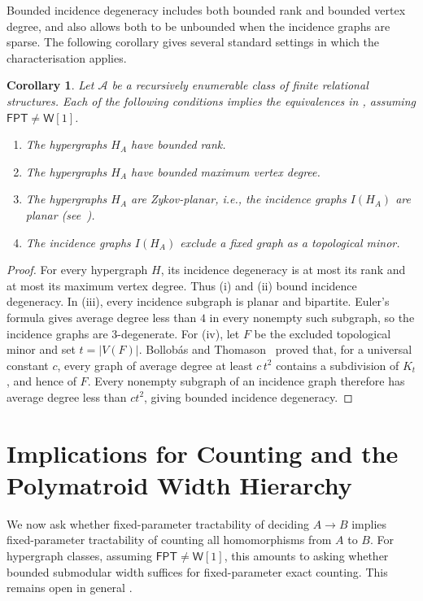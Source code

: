 \documentclass[11pt,letterpaper]{article}
\newtheorem{corollary}[corollary]{Corollary}
\theoremstyle{definition}
\theoremstyle{remark}
\newcommand{\cA}{\mathcal A}
\newcommand{\FPT}{\ensuremath{\mathsf{FPT}}}
\newcommand{\wone}{\ensuremath{\mathsf{W}[1]}}
\providecommand{\FPT}{\ensuremath{\mathsf{FPT}}}
\begin{document}
Bounded incidence degeneracy includes both bounded rank and bounded
vertex degree, and also allows both to be unbounded when the incidence
graphs are sparse. The following corollary gives several standard
settings in which the characterisation applies.

\begin{corollary}
\label{cor:sparse-incidence-classes}
Let $\cA$ be a recursively enumerable class of finite relational structures.
Each of the following conditions implies the equivalences in
, assuming $\FPT\ne \wone$.
\begin{enumerate}[label=(\roman*)]
 \item The hypergraphs $H_A$ have bounded rank.
 \item The hypergraphs $H_A$ have bounded maximum vertex degree.
 \item The hypergraphs $H_A$ are Zykov-planar, i.e., the
 incidence graphs $I(H_A)$ are planar (see~\cite{Zykov1974}).
 \item The incidence graphs $I(H_A)$ exclude a fixed graph as a topological minor.
\end{enumerate}
\end{corollary}

\begin{proof}
For every hypergraph $H$, its incidence degeneracy is at most its rank
and at most its maximum vertex degree. Thus (i) and (ii) bound incidence
degeneracy. In (iii), every incidence subgraph is planar and bipartite.
Euler's formula gives average degree less than $4$ in every nonempty
such subgraph, so the incidence graphs are $3$-degenerate.
For (iv), let $F$ be the excluded topological minor and set $t=|V(F)|$.
Bollob\'as and Thomason~\cite{BollobasThomason1998} proved that, for a
universal constant $c$, every graph of average degree at least $c\,t^2$
contains a subdivision of $K_t$, and hence of $F$.
Every nonempty subgraph of an incidence graph therefore has average
degree less than $ct^2$, giving bounded incidence degeneracy.
\end{proof}
\section{Implications for Counting and the Polymatroid Width Hierarchy}
\label{sec:discussion}

We now ask whether fixed-parameter tractability of deciding $A\to B$
implies fixed-parameter tractability of counting all homomorphisms from
$A$ to $B$. For hypergraph classes, assuming $\FPT\ne\wone$, this amounts
to asking whether bounded submodular width suffices for fixed-parameter
exact counting. This remains open in general
\cite{KhamisEtAl2019FAQAI,KoutrisEtAl2025FasterJoins,jaguar}.
\end{document}
